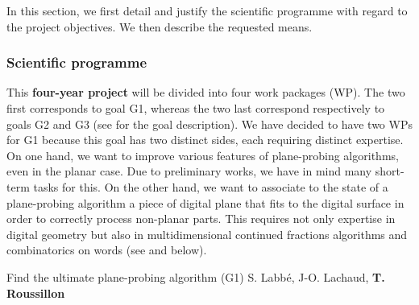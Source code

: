 In this section, we first detail and justify the scientific programme with regard to the project objectives.
We then describe the requested means. 

\subsubsection{Scientific programme}
\label{sec:wp}


This \textbf{four-year project} will be divided into four work packages (WP).
The two first corresponds to goal G1, whereas the two last correspond
respectively to goals G2 and G3 (see  for the goal description).
We have decided to have two WPs for G1 because this goal has two distinct sides,
each requiring distinct expertise. On one hand, we want to improve various
features of plane-probing algorithms, even in the planar case. Due to
preliminary works, we have in mind many short-term tasks for this.
On the other hand, we want to associate to the state of a plane-probing
algorithm a piece of digital plane that fits to the digital surface in order
to correctly process non-planar parts. This requires not only expertise
in digital geometry but also in multidimensional continued
fractions algorithms and combinatorics on words (see  and below).

\newpage

   {Find the ultimate plane-probing algorithm (G1)}
   {S. Labb\'{e}, J-O. Lachaud, \textbf{T. Roussillon}}
\medskip


